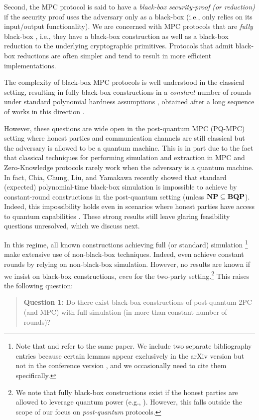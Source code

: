 Second, the MPC protocol is said to have a {\em black-box security-proof (or reduction)} if the security proof uses the adversary only as a black-box (i.e., only relies on its input/output functionality). We are concerned with MPC protocols that are {\em fully} black-box \cite{STOC:ImpRud89,TCC:ReiTreVad04}, i.e., they have a black-box construction as well as a black-box reduction to the underlying cryptographic primitives. Protocols that admit black-box reductions are often simpler and tend to result in more efficient implementations.

The complexity of black-box MPC protocols is well understood in the classical setting, resulting in fully black-box constructions in a {\em constant} number of rounds under standard polynomial hardness assumptions \cite{STOC:Goyal11}, obtained after a long sequence of works in this direction \cite{STOC:IKLP06,STOC:IKOS07,TCC:Haitner08,C:IshPraSah08,TCC:PasWee09,TCC:CDMW09,FOCS:Wee10}.


However, these questions are wide open in the post-quantum MPC (PQ-MPC) setting where honest parties and communication channels are still classical but the adversary is allowed to be a quantum machine. This is in part due to the fact that classical techniques for performing simulation and extraction in MPC and Zero-Knowledge protocols rarely work when the adversary is a quantum machine. In fact, Chia, Chung, Liu, and Yamakawa \cite{chia2022impossibility} recently showed that standard (expected) polynomial-time black-box simulation is impossible to achieve by constant-round constructions in the post-quantum setting (unless $\mathbf{NP} \subseteq \mathbf{BQP}$). Indeed, this impossibility holds even in scenarios where honest parties have access to quantum capabilities \cite{arXiv:CCLL}. These strong results still leave  glaring feasibility questions unresolved, which we discuss next.

 In this regime, all known constructions achieving full (or standard) simulation \cite{EC:ABGKM21,FOCS:LPY23,goyal2023concurrent}\footnote{Note that \cite{arXiv:LPY23} and \cite{FOCS:LPY23} refer to the same paper. We include two separate bibliography entries because certain lemmas appear exclusively in the arXiv version \cite{arXiv:LPY23} but not in the conference version \cite{FOCS:LPY23}, and we occasionally need to cite them specifically.} make extensive use of non-black-box techniques. Indeed, \cite{EC:ABGKM21,FOCS:LPY23} even achieve constant rounds by relying on non-black-box simulation. However, no results are known if we insist on black-box constructions, {\em even} for the two-party setting.\footnote{We note that fully black-box constructions exist if the honest parties are allowed to leverage quantum power (e.g., \cite{C:BCKM21b,EC:GLSV21}). However, this falls outside the scope of our focus on {\em post-quantum} protocols.} This raises the following question:
\begin{quote}
 {\bf Question 1:} Do there exist black-box constructions of post-quantum 2PC (and MPC) with full simulation (in more than constant number of rounds)?
\end{quote} 

